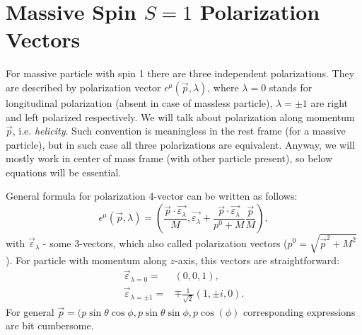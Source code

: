 \documentclass[12pt]{revtex4-1}
\begin{document}
\section{Massive Spin $S=1$ Polarization Vectors}

For massive particle with spin 1 there are three independent polarizations.
They are described by polarization vector $\epsilon^{\mu}(\vec{p}, \lambda)$,
where $\lambda = 0$ stands for longitudinal polarization (absent in case
of massless particle), $\lambda = \pm 1$ are right and left polarized 
respectively.
We will talk about polarization along  momentum $\vec{p}$, i.e. \textit{helicity}.
Such convention is meaningless in the rest frame (for a massive particle),
but in such case all three polarizations are equivalent. Anyway, we will
mostly work in center of mass frame (with other particle present), so 
below equations will be essential.

General formula for polarization 4-vector can be written as follows:
\begin{equation}
	\epsilon^{\mu}(\vec p, \lambda) = \left( \frac{\vec{p}\cdot 
	\vec{\varepsilon_{\lambda}}}{M} , \vec{\varepsilon_{\lambda}}
	+ \frac{\vec{p}\cdot 
	\vec{\varepsilon_{\lambda}}}{p^0 + M} \frac{\vec{p}}{M}
	\right),
\end{equation}
with $\vec{\varepsilon}_{\lambda}$ - some 3-vectors, which also called
polarization vectors ($p^0 = \sqrt{\vec{p}^2 + M^2}$).
For particle with momentum along $z$-axis, this vectors are straightforward:
\begin{align} \label{eqn:polarization-3-vectors}
	\vec{\varepsilon}_{\lambda = 0}= & (0, 0 ,1), \\
	\vec{\varepsilon}_{\lambda = \pm 1}= & \mp \frac{1}{\sqrt{2}}(1, \pm i,0).
\end{align}
For general $\vec{p} = (p \sin\theta \cos\phi, p \sin\theta \sin\phi,
p \cos(\phi)$ corresponding expressions are bit cumbersome.
\end{document}
